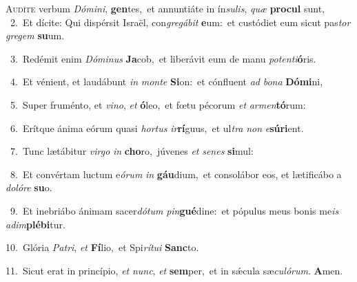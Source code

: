 \lettrine{\initial\textcolor{\initialcolor}{A}}{udíte} verbum \textit{Dó}\-\textit{mi}\textit{ni}, \textbf{gen}\-tes,~\star et annuntiáte in ín\-\textit{su}\-\textit{lis}, \textit{quæ} \textbf{pro}\-\textbf{cul} sunt,\\
{\numbfont\textcolor{\numbcolor}{~2.}}~Et dícite: Qui dispérsit Israël, con\-\textit{gre}\-\textit{gá}\textit{bit} \textbf{e}\-um:~\star et custódiet eum sicut pas\textit{tor} \textit{gre}\-\textit{gem} \textbf{su}\-um.\par
{\numbfont\textcolor{\numbcolor}{~3.}}~Redémit enim \textit{Dó}\-\textit{mi}\textit{nus} \textbf{Ja}\-cob,~\star et liberávit eum de manu \textit{pot}\-\textit{en}\textit{ti}\textbf{ó}ris.\par
{\numbfont\textcolor{\numbcolor}{~4.}}~Et vénient, et laudábunt \textit{in} \textit{mon}\-\textit{te} \textbf{Si}\-on:~\star et cónfluent \textit{ad} \textit{bo}\-\textit{na} \textbf{Dó}\-\textbf{mi}ni,\par
{\numbfont\textcolor{\numbcolor}{~5.}}~Super fruménto, et \textit{vi}\-\textit{no}, \textit{et} \textbf{ó}\-leo,~\star et fœtu pécorum \textit{et} \textit{ar}\-\textit{men}\textbf{tó}rum:\par
{\numbfont\textcolor{\numbcolor}{~6.}}~Erítque ánima eórum quasi \textit{hor}\-\textit{tus} \textit{ir}\-\textbf{rí}guus,~\star et ul\textit{tra} \textit{non} \textit{e}\-\textbf{sú}\textbf{ri}ent.\par
{\numbfont\textcolor{\numbcolor}{~7.}}~Tunc lætábitur \textit{vir}\-\textit{go} \textit{in} \textbf{cho}\-ro,~\star júvenes \textit{et} \textit{se}\-\textit{nes} \textbf{si}\-mul:\par
{\numbfont\textcolor{\numbcolor}{~8.}}~Et convértam luctum e\-\textit{ó}\-\textit{rum} \textit{in} \textbf{gáu}\-dium,~\star et consolábor eos, et lætificábo a \textit{do}\-\textit{ló}\textit{re} \textbf{su}\-o.\par
{\numbfont\textcolor{\numbcolor}{~9.}}~Et inebriábo ánimam sacer\-\textit{dó}\-\textit{tum} \textit{pin}\-\textbf{gué}dine:~\star et pópulus meus bonis me\textit{is} \textit{ad}\-\textit{im}\textbf{plé}\textbf{bi}tur.\par
{\numbfont\textcolor{\numbcolor}{10.}}~Glória \textit{Pa}\-\textit{tri}, \textit{et} \textbf{Fí}\-lio,~\star et Spi\-\textit{rí}\-\textit{tu}\textit{i} \textbf{Sanc}\-to.\par
{\numbfont\textcolor{\numbcolor}{11.}}~Sicut erat in princípio, \textit{et} \textit{nunc}\-, \textit{et} \textbf{sem}\-per,~\star et in sǽcula sæ\-\textit{cu}\-\textit{ló}\textit{rum}. \textbf{A}\-men.\par
